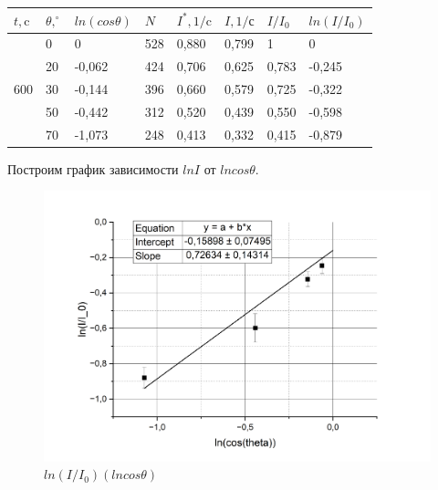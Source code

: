 \documentclass[a4paper,12pt]{article} %
\begin{document}
\begin{table}[h!]
\begin{tabular}{|c|l|l|l|l|l|l|l|}
\hline
\multicolumn{1}{|l|}{$t, \text{c}$} & $\theta, ^\circ$ & $ln(cos \theta)$ & $N$ & $I^*, \text{1/c}$ & $I, \text{1/с}$ & $I/I_0$ & $ln(I/I_0)$ \\ \hline
\multirow{5}{*}{600}                & 0                & 0                & 528 & 0,880             & 0,799           & 1       & 0           \\ \cline{2-8} 
                                    & 20               & -0,062           & 424 & 0,706             & 0,625           & 0,783   & -0,245      \\ \cline{2-8} 
                                    & 30               & -0,144           & 396 & 0,660             & 0,579           & 0,725   & -0,322      \\ \cline{2-8} 
                                    & 50               & -0,442           & 312 & 0,520             & 0,439           & 0,550   & -0,598      \\ \cline{2-8} 
                                    & 70               & -1,073           & 248 & 0,413             & 0,332           & 0,415   & -0,879      \\ \hline
\end{tabular}
\end{table}

\noindent Построим график зависимости $lnI$ от $ln cos \theta$. 

\begin{figure}[h!]
    \centering
    \includegraphics[scale=0.5]{2.png}
    \caption{$ln(I/I_0) (ln cos \theta)$}
    
\end{figure}
\end{document}
